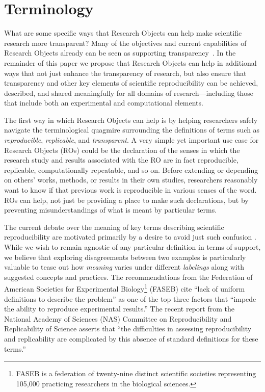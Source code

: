 \section{Terminology}\label{sec-terminology}

What are some specific ways that Research Objects \cite{bechhofer2013whya} can help
	make scientific research more transparent?
Many of the objectives and current capabilities of Research Objects already can be seen as supporting
	transparency~\cite{mecum2018preservingc,DBLP:conf/eScience/2018}.
In the remainder of this paper we propose that Research Objects can help in additional ways that not
	just enhance the transparency of research, but also ensure that transparency and other key elements
	of scientific reproducibility can be achieved, described, and shared meaningfully for all domains
	of research---including those that include both an experimental and computational elements.

The first way in which Research Objects can help is by helping researchers safely navigate the
	terminological quagmire surrounding the definitions of terms such as \emph{reproducible},
	\emph{replicable}, and \emph{transparent}.
A very simple yet important use case for Research Objects (ROs) could be the declaration of the senses in
	which the research study and results associated with the RO are in fact reproducible, replicable,
	computationally repeatable, and so on.
Before extending or depending on others' works, methods, or results in their own studies, researchers
	reasonably want to know if that previous work is reproducible in various senses of the word.
ROs can help, not just be providing a place to make such declarations, but by preventing
	misunderstandings of what is meant by particular terms.

The current debate over the meaning of key terms describing
	scientific reproducibility are motivated primarily by a desire to avoid just such confusion
    \cite{drummond2009replicability,goodman2016what,rauber16primad,herouxtoward,
    plesser2018reproducibility,barba2018terminologies,
    committeeonreproducibilityandreplicabilityinscience2019reproducibility}.
While we wish to remain agnostic of any particular definition in terms of support, we believe
    that exploring disagreements between two examples is particularly valuable to tease out
    how \emph{meaning} varies under different \emph{labelings} along with suggested concepts
    and practices.
The recommendations from the Federation of
	American Societies for Experimental Biology\footnote{FASEB is a federation of twenty-nine distinct scientific societies representing 105,000
	practicing researchers in the biological sciences.}
	(FASEB)
	\cite{FASEB2016enhancing} cite ``lack of uniform definitions to describe the problem''
	as one of the top three factors that ``impede the ability to reproduce experimental results.''
 The recent report from the National Academy of Sciences (NAS) Committee on Reproducibility and Replicability of Science \cite{committeeonreproducibilityandreplicabilityinscience2019reproducibility} asserts
	that ``the difficulties in assessing reproducibility and replicability are complicated by this absence of
	standard definitions for these terms.''


